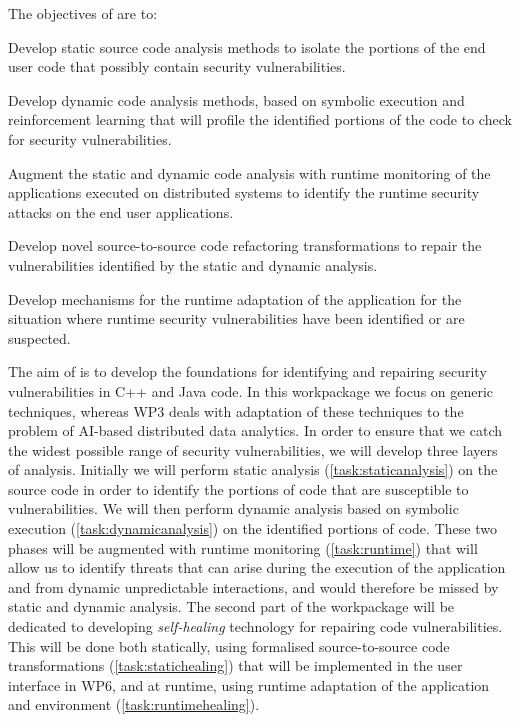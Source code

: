 \addtocounter{wpno}{1}
\begin{Workpackage}{\thewpno}
\WPTitle{\wpname{\thewpno}}

\begin{WPObjectives}
The objectives of \theWP{} are to:
\begin{compactitem}
\item Develop static source code analysis methods to isolate the portions of the end user code that possibly contain security vulnerabilities.
\item Develop dynamic code analysis methods, based on symbolic execution and reinforcement learning that will profile the identified portions of the code to check for security vulnerabilities.
\item Augment the static and dynamic code analysis with runtime monitoring of the applications executed on distributed systems to identify the runtime security attacks on the end user applications.
\item Develop novel source-to-source code refactoring transformations to repair the vulnerabilities identified by the static and dynamic analysis.
\item Develop mechanisms for the runtime adaptation of the application for the situation where runtime security vulnerabilities have been identified or are suspected.
\end{compactitem}
\end{WPObjectives}

\begin{WPDescription}
The aim of \theWP{} is to develop the foundations %
for identifying and repairing security vulnerabilities in C++ and Java code. In this workpackage we focus on generic techniques, whereas WP3 deals with adaptation of these techniques to the problem of AI-based distributed data analytics. In order to ensure that we catch the widest possible range of security vulnerabilities, we will develop three layers of analysis. Initially we will perform static analysis (\ref{task:staticanalysis}) on the source code in order to identify the portions of code that are susceptible to vulnerabilities. We will then perform dynamic analysis based on symbolic execution (\ref{task:dynamicanalysis}) on the identified portions of code. These two phases will be augmented with runtime monitoring (\ref{task:runtime}) that will allow us to identify threats that can arise during the execution of the application and from dynamic unpredictable interactions, and would therefore be missed by static and dynamic analysis. The second part of the workpackage will be dedicated to developing \emph{self-healing} technology for repairing code vulnerabilities. This will be done both statically, using formalised source-to-source code transformations ({\ref{task:statichealing}}) that will be implemented in the user interface in WP6, and at runtime, using runtime adaptation of the application and environment (\ref{task:runtimehealing}).
\end{WPDescription}


\end{Workpackage}
